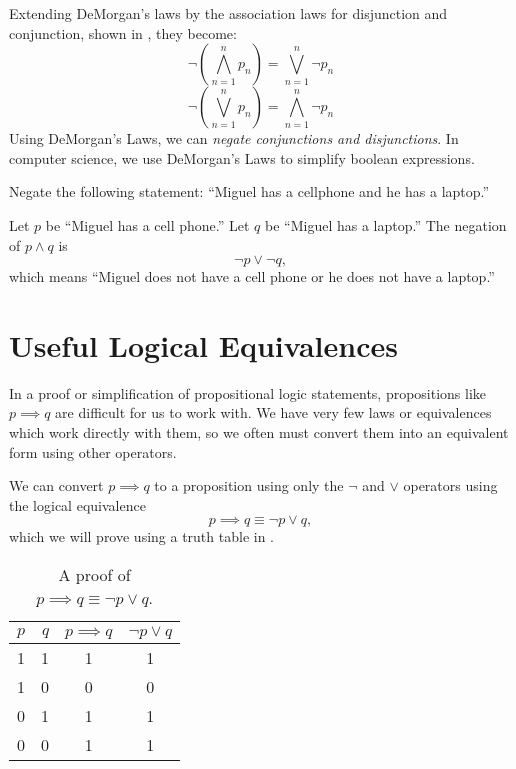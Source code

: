 Extending DeMorgan's laws by the association laws for disjunction and conjunction, shown in , they become:
\begin{equation}
 \neg\left(\bigwedge^n_{n=1} p_n\right)=\bigvee^n_{n=1} \neg p_n
\end{equation}
\begin{equation}
 \neg\left(\bigvee^n_{n=1} p_n\right)=\bigwedge^n_{n=1} \neg p_n
\end{equation}
Using DeMorgan's Laws, we can \emph{negate conjunctions and disjunctions}.
In computer science, we use DeMorgan's Laws to simplify boolean expressions.

\begin{ex}
  Negate the following statement:
  ``Miguel has a cellphone and he has a laptop.''
  \begin{sol}
    Let \(p\) be ``Miguel has a cell phone.''
    Let \(q\) be ``Miguel has a laptop.''
    The negation of $p \land q$ is
    \[ \neg p \lor \neg q, \]
    which means ``Miguel does not have a cell phone or he does not have a laptop.''
  \end{sol}
\end{ex}

\section{Useful Logical Equivalences}

In a proof or simplification of propositional logic statements, propositions like $p \implies q$
are difficult for us to work with.
We have very few laws or equivalences which work directly with them, so we often must convert them into an equivalent form using other operators.


We can convert $p\implies q$ to a proposition using only the $\neg$ and $\lor$ operators using the logical equivalence
\begin{equation}
  p \implies q \equiv \neg p \lor q,
\end{equation}
which we will prove using a truth table in .
\begin{table}[H]
  \centering
    \begin{tabular}{lrcc}
      \toprule
      $p$ & $q$ & $p \implies q$ & $\neg p \lor q$ \\ \midrule
      1 & 1 & 1 & 1 \\
      1 & 0 & 0 & 0 \\
      0 & 1 & 1 & 1 \\
      0 & 0 & 1 & 1 \\
      \bottomrule
    \end{tabular}
  \caption{A proof of \(p \implies q \equiv \neg p \lor q\).}
  \label{tab:conditionalproof}
\end{table}

